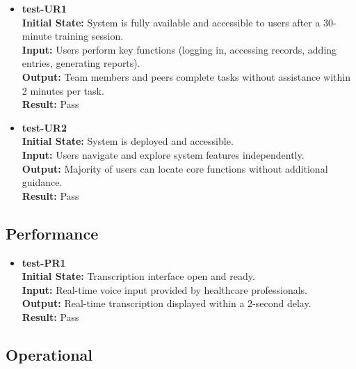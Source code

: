 \documentclass[12pt, titlepage]{article}
\begin{document}
\begin{itemize}
\item \textbf{test-UR1} \label{test-UR1} \\
\textbf{Initial State:} System is fully available and accessible to users after a 30-minute training session. \\
\textbf{Input:} Users perform key functions (logging in, accessing records, adding entries, generating reports). \\
\textbf{Output:} Team members and peers complete tasks without assistance within 2 minutes per task. \\
\textbf{Result:} Pass \\

\item \textbf{test-UR2} \label{test-UR2} \\
\textbf{Initial State:} System is deployed and accessible. \\
\textbf{Input:} Users navigate and explore system features independently. \\
\textbf{Output:} Majority of users can locate core functions without additional guidance. \\
\textbf{Result:} Pass \\
\end{itemize}

\subsection{Performance} \label{section:4.3}

\begin{itemize}
\item \textbf{test-PR1} \label{test-PR1} \\
\textbf{Initial State:} Transcription interface open and ready. \\
\textbf{Input:} Real-time voice input provided by healthcare professionals. \\
\textbf{Output:} Real-time transcription displayed within a 2-second delay. \\
\textbf{Result:} Pass \\
\end{itemize}

\subsection{Operational} \label{section:4.4}
\end{document}
